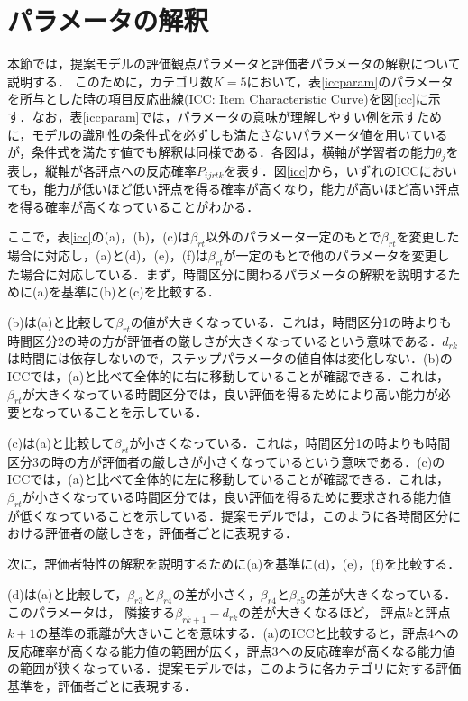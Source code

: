 \documentclass[a4paper,11pt,oneside,openany]{jsbook}
\begin{document}
\section{パラメータの解釈}
本節では，提案モデルの評価観点パラメータと評価者パラメータの解釈について説明する．
このために，カテゴリ数$K=5$において，表\ref{iccparam}のパラメータを所与とした時の項目反応曲線(ICC: Item Characteristic Curve)を図\ref{icc}に示す．なお，表\ref{iccparam}では，パラメータの意味が理解しやすい例を示すために，モデルの識別性の条件式を必ずしも満たさないパラメータ値を用いているが，条件式を満たす値でも解釈は同様である．各図は，横軸が学習者の能力$\theta_j$を表し，縦軸が各評点への反応確率$P_{ijrtk}$を表す．図\ref{icc}から，いずれのICCにおいても，能力が低いほど低い評点を得る確率が高くなり，能力が高いほど高い評点を得る確率が高くなっていることがわかる．

ここで，表\ref{icc}の(a)，(b)，(c)は$\beta_{rt}$以外のパラメータ一定のもとで$\beta_{rt}$を変更した場合に対応し，(a)と(d)，(e)，(f)は$\beta_{rt}$が一定のもとで他のパラメータを変更した場合に対応している．まず，時間区分に関わるパラメータの解釈を説明するために(a)を基準に(b)と(c)を比較する．

(b)は(a)と比較して$\beta_{rt}$の値が大きくなっている．これは，時間区分1の時よりも時間区分2の時の方が評価者の厳しさが大きくなっているという意味である．$d_{rk}$は時間には依存しないので，ステップパラメータの値自体は変化しない．(b)のICCでは，(a)と比べて全体的に右に移動していることが確認できる．これは，$\beta_{rt}$が大きくなっている時間区分では，良い評価を得るためにより高い能力が必要となっていることを示している．

(c)は(a)と比較して$\beta_{rt}$が小さくなっている．これは，時間区分1の時よりも時間区分3の時の方が評価者の厳しさが小さくなっているという意味である．(c)のICCでは，(a)と比べて全体的に左に移動していることが確認できる．これは，$\beta_{rt}$が小さくなっている時間区分では，良い評価を得るために要求される能力値が低くなっていることを示している．提案モデルでは，このように各時間区分における評価者の厳しさを，評価者ごとに表現する．

次に，評価者特性の解釈を説明するために(a)を基準に(d)，(e)，(f)を比較する．

(d)は(a)と比較して，$\beta_{r3}$と$\beta_{r4}$の差が小さく，$\beta_{r4}$と$\beta_{r5}$の差が大きくなっている．このパラメータは， 隣接する$\beta_{rk+1} − d_{rk}$の差が大きくなるほど， 評点$k$と評点$k+1$の基準の乖離が大きいことを意味する．(a)のICCと比較すると，評点4への反応確率が高くなる能力値の範囲が広く，評点3への反応確率が高くなる能力値の範囲が狭くなっている．提案モデルでは，このように各カテゴリに対する評価基準を，評価者ごとに表現する．
\end{document}
